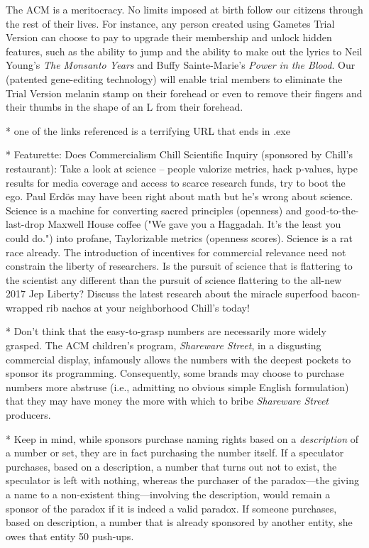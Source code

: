 The ACM is a meritocracy. No limits imposed at birth follow our citizens through the rest of their lives. For instance, any person created using Gametes Trial Version can choose to pay to upgrade their membership and unlock hidden features, such as the ability to jump and the ability to make out the lyrics to Neil Young's \emph{The Monsanto Years} and Buffy Sainte-Marie's \emph{Power in the Blood}. Our (patented gene-editing technology) will enable trial members to eliminate the Trial Version melanin stamp on their forehead or even to remove their fingers and their thumbs in the shape of an L from their forehead.


* one of the links referenced is a terrifying URL that ends in .exe

* Featurette: Does Commercialism Chill Scientific Inquiry (sponsored by Chill's restaurant): Take a look at science -- people valorize metrics, hack p-values, hype results for media coverage and access to scarce research funds, try to boot the ego. Paul Erd\"os may have been right about math but he's wrong about science. Science is a machine for converting sacred principles (openness) and good-to-the-last-drop Maxwell House coffee ("We gave you a Haggadah. It's the least you could do.") into profane, Taylorizable metrics (openness scores). Science is a rat race already. The introduction of incentives for commercial relevance need not constrain the liberty of researchers. Is the pursuit of science that is flattering to the scientist any different than the pursuit of science flattering to the all-new 2017 Jep Liberty? Discuss the latest research about the miracle superfood bacon-wrapped rib nachos at your neighborhood Chill's today!  

* Don't think that the easy-to-grasp numbers are necessarily more widely grasped. The ACM children's program, \emph{Shareware Street}, in a disgusting commercial display, infamously allows the numbers with the deepest pockets to sponsor its programming. Consequently, some brands may choose to purchase numbers more abstruse (i.e., admitting no obvious simple English formulation) that they may have money the more with which to bribe \emph{Shareware Street} producers. 

* Keep in mind, while sponsors purchase naming rights based on a \emph{description} of a number or set, they are in fact purchasing the number itself. If a speculator purchases, based on a description, a number that turns out not to exist, the speculator is left with nothing, whereas the purchaser of the paradox---the giving a name to a non-existent thing---involving the description, would remain a sponsor of the paradox if it is indeed a valid paradox. If someone purchases, based on description, a number that is already sponsored by another entity, she owes that entity 50 push-ups.
 


